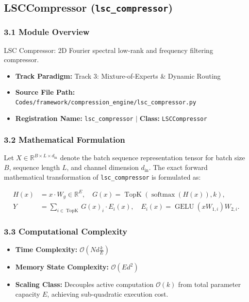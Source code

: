 \subsection{LSCCompressor (\texttt{lsc\_compressor})}
\label{sec:app_module_lsc_compressor}

\subsubsection*{3.1 Module Overview}
LSC Compressor: 2D Fourier spectral low-rank and frequency filtering compressor.
\begin{itemize}
    \item \textbf{Track Paradigm:} Track 3: Mixture-of-Experts & Dynamic Routing
    \item \textbf{Source File Path:} \texttt{Codes/framework/compression\_engine/lsc\_compressor.py}
    \item \textbf{Registration Name:} \texttt{lsc\_compressor} $\mid$ \textbf{Class:} \texttt{LSCCompressor}
\end{itemize}

\subsubsection*{3.2 Mathematical Formulation}
Let $X \in \mathbb{R}^{B \times L \times d_{\text{in}}}$ denote the batch sequence representation tensor for batch size $B$, sequence length $L$, and channel dimension $d_{\text{in}}$. The exact forward mathematical transformation of \texttt{lsc\_compressor} is formulated as:

\begin{align}
H(x) &= x \cdot W_g \in \mathbb{R}^{E}, \quad G(x) = \operatorname{TopK}\left(\operatorname{softmax}(H(x)), k\right), \\
Y &= \sum_{i \in \operatorname{TopK}} G(x)_i \cdot E_i(x), \quad E_i(x) = \operatorname{GELU}(x W_{1, i}) W_{2, i}.
\end{align}


\subsubsection*{3.3 Computational Complexity}
\begin{itemize}
    \item \textbf{Time Complexity:} $\mathcal{O}(N d \frac{k}{E})$
    \item \textbf{Memory State Complexity:} $\mathcal{O}(E d^2)$
    \item \textbf{Scaling Class:} Decouples active computation $\mathcal{O}(k)$ from total parameter capacity $E$, achieving sub-quadratic execution cost.
\end{itemize}

